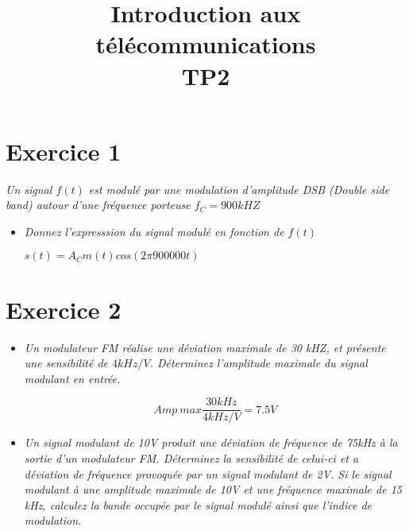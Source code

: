 \documentclass[a4paper, 11pt, onecolumn]{article}
\title{Introduction aux télécommunications\\TP2}
\begin{document}
\maketitle
\section{Exercice 1}
    \textit{Un signal $f(t)$ est modulé par une modulation d'amplitude DSB (Double side band) autour d'une fréquence porteuse $f_C=900kHZ$}
	\begin{itemize}
		\item \textit{Donnez l'expresssion du signal modulé en fonction de $f(t)$}
		\begin{framed}
			$s(t) = A_C m(t) cos(2\pi 900000t)$
		\end{framed}
	\end{itemize}

\section{Exercice 2}
	\begin{itemize}
		\item \textit{Un modulateur FM réalise une déviation maximale de 30 kHZ, et présente une sensibilité de $4kHz/V$. Déterminez l'amplitude maximale du signal modulant en entrée.}
		\begin{framed}
			$$Amp\ max \frac{30kHz}{4kHz/V} = 7.5V$$
		\end{framed}
		\item \textit{Un signal modulant de 10V produit une déviation de fréquence de 75kHz à la sortie d'un modulateur FM. Déterminez la sensibilité de celui-ci et a déviation de fréquence provoquée par un signal modulant de 2V. Si le signal modulant à une amplitude maximale de 10V et une fréquence maximale de 15 kHz, calculez la bande occupée par le signal modulé ainsi que l'indice de modulation.}
	\end{itemize}
\end{document}
